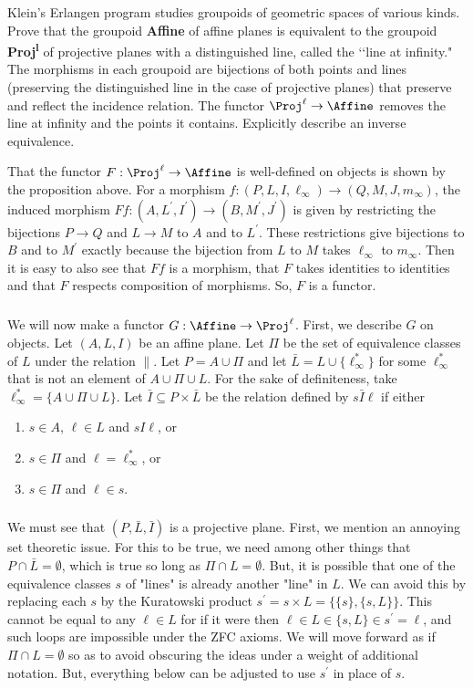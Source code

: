 \documentclass[../../main]{subfiles}
\begin{document}
\begin{exercise}
	Klein's Erlangen program studies groupoids of geometric spaces of various
	kinds. Prove that the groupoid {\bf Affine} of affine planes is equivalent
	to the groupoid {\bf Proj\textsuperscript{l}} of projective planes with a
	distinguished line, called the \lq\lq line at infinity." The morphisms in
	each groupoid are bijections of both points and lines (preserving the
	distinguished line in the case of projective planes) that preserve and
	reflect the incidence relation. The functor $\Proj^\ell\rightarrow\Affine$
	removes the line at infinity and the points it contains. Explicitly describe
	an inverse equivalence.
\end{exercise}

That the functor $F:\Proj^\ell\rightarrow\Affine$ is well-defined on objects is
shown by the proposition above. For a morphism
$f:(P,L,I,\ell_\infty)\rightarrow(Q,M,J,m_\infty)$, the induced morphism
$Ff:(A,L^\prime,I^\prime)\rightarrow(B,M^\prime,J^\prime)$ is given by
restricting the bijections $P\rightarrow Q$ and $L\rightarrow M$ to $A$ and to
$L^\prime$. These restrictions give bijections to $B$ and to $M^\prime$ exactly
because the bijection from $L$ to $M$ takes $\ell_\infty$ to $m_\infty$. Then it
is easy to also see that $Ff$ is a morphism, that $F$ takes identities to
identities and that $F$ respects composition of morphisms. So, $F$ is a functor.

\subparagraph{}
We will now make a functor $G:\Affine\rightarrow\Proj^\ell$. First, we describe
$G$ on objects. Let $(A,L,I)$ be an affine plane. Let $\Pi$ be the set of
equivalence classes of $L$ under the relation $\parallel$. Let $P=A\cup\Pi$ and
let $\bar L=L\cup\{\ell^*_\infty\}$ for some $\ell^*_\infty$ that is not an
element of $A\cup\Pi\cup L$. For the sake of definiteness, take
$\ell^*_\infty=\{A\cup\Pi\cup L\}$. Let $\bar I\subseteq P\times\bar L$ be the
relation defined by $s\bar I\ell$ if either
\begin{enumerate}
	\item $s\in A$, $\ell\in L$ and $sI\ell$, or
	\item $s\in\Pi$ and $\ell=\ell^*_\infty$, or
	\item $s\in\Pi$ and $\ell\in s$.
\end{enumerate}

\subparagraph{}
We must see that $(P,\bar L,\bar I)$ is a projective plane. First, we mention an
annoying set theoretic issue. For this to be true, we need among other things
that $P\cap\bar L=\emptyset$, which is true so long as $\Pi\cap L=\emptyset$.
But, it is possible that one of the equivalence classes $s$ of "lines" is
already another "line" in $L$. We can avoid this by replacing each $s$ by the
Kuratowski product $s^\prime =s\times L=\{\{s\},\{s,L\}\}$. This cannot be equal
to any $\ell\in L$ for if it were then $\ell\in L\in\{s,L\}\in s^\prime =\ell$,
and such loops are impossible under the ZFC axioms. We will move forward as if
$\Pi\cap L=\emptyset$ so as to avoid obscuring the ideas under a weight of
additional notation. But, everything below can be adjusted to use $s^\prime$ in
place of $s$.
\end{document}
